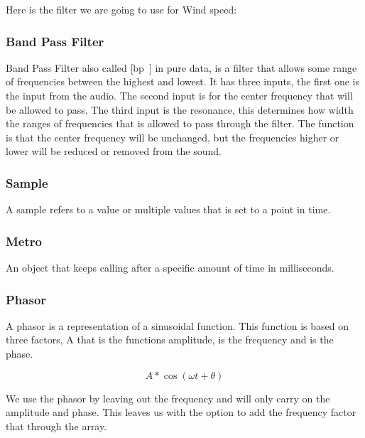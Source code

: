 Here is the filter we are going to use for Wind speed:


\subsubsection{Band Pass Filter} %
\label{ssub:band_pass_filter}

Band Pass Filter also called [bp~] in pure data, is a filter that allows some range of frequencies between the highest and lowest. 
It has three inputs, the first one is the input from the audio. 
The second input is for the center frequency that will be allowed to pass. 
The third input is the resonance, this determines how width the ranges of frequencies that is allowed to pass through the filter. 
The function is that the center frequency will be unchanged, but the frequencies higher or lower will be reduced or removed from the sound.



\subsubsection{Sample} %
\label{ssub:sample}

A sample refers to a value or multiple values that is set to a point in time.



\subsubsection{Metro} %
\label{ssub:metro}

An object that keeps calling after a specific amount of time in milliseconds.

    

\subsubsection{Phasor} %
\label{ssub:phasor}

A phasor is a representation of a sinusoidal function. 
This function is based on three factors, A that is the functions amplitude, is the frequency and  is the phase.  

\begin{equation}
    A * \cos(\omega t + \theta)
\end{equation}

We use the phasor by leaving out the frequency and will only carry on the amplitude and phase. 
This leaves us with the option to add the frequency factor that through the array.

